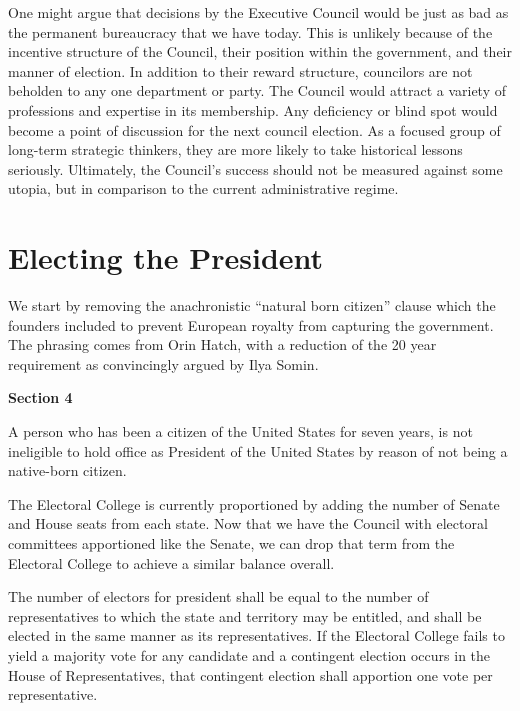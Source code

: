 \documentclass{article}
\newcommand{\quotes}[1]{``#1''}
\begin{document}
One might argue that decisions by the Executive Council would be just as bad as the permanent bureaucracy that we have today. This is unlikely because of the incentive structure of the Council, their position within the government, and their manner of election. In addition to their reward structure, councilors are not beholden to any one department or party. The Council would attract a variety of professions and expertise in its membership. Any deficiency or blind spot would become a point of discussion for the next council election. As a focused group of long-term strategic thinkers, they are more likely to take historical lessons seriously. Ultimately, the Council's success should not be measured against some utopia, but in comparison to the current administrative regime.

\section{Electing the President}

We start by removing the anachronistic \quotes{natural born citizen} clause which the founders included to prevent European royalty from capturing the government. The phrasing comes from Orin Hatch\cite{Somin_Hatch}, with a reduction of the 20 year requirement as convincingly argued by Ilya Somin\cite{Somin_NBC}.

\begin{quoting}
\textbf{Section 4}

A person who has been a citizen of the United States for seven years, is not ineligible to hold office as President of the United States by reason of not being a native-born citizen.
\end{quoting}

The Electoral College is currently proportioned by adding the number of Senate and House seats from each state. Now that we have the Council with electoral committees apportioned like the Senate, we can drop that term from the Electoral College to achieve a similar balance overall.

\begin{quoting}
The number of electors for president shall be equal to the number of representatives to which the state and territory may be entitled, and shall be elected in the same manner as its representatives. If the Electoral College fails to yield a majority vote for any candidate and a contingent election occurs in the House of Representatives, that contingent election shall apportion one vote per representative.
\end{quoting}
\end{document}
